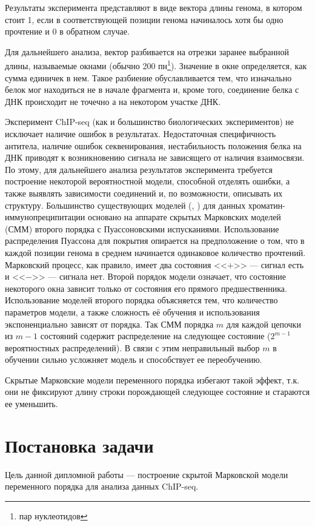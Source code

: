 \documentclass{matmex-diploma-custom}
\begin{document}
Результаты эксперимента представляют в виде вектора длины генома, в котором
стоит 1, если в соответствующей позиции генома начиналось хотя бы одно прочтение
и 0 в обратном случае.

Для дальнейшего анализа, вектор разбивается на отрезки заранее выбранной длины, называемые окнами (обычно 200 пн\footnote{пар нуклеотидов}). Значение в окне определяется, как сумма единичек в нем. 
Такое разбиение обуславливается тем, что изначально белок мог находиться не в начале фрагмента и, кроме того, соединение белка с ДНК происходит не точечно а на некотором участке ДНК.

Эксперимент ChIP-seq (как и большинство биологических
экспериментов) не исключает наличие ошибок в результатах. Недостаточная специфичность антитела, наличие ошибок секвенирования, нестабильность положения белка на ДНК приводят к возникновению сигнала не
зависящего от наличия взаимосвязи.
По этому, для дальнейшего анализа результатов эксперимента требуется построение некоторой вероятностной модели, способной отделять ошибки, а также 
выявлять зависимости соединений и, по возможности, описывать их структуру.
Большинство существующих моделей (\cite{Zhang2008}, \cite{Spyrou2009}) для данных
хроматин-иммунопреципитации основано на аппарате скрытых Марковских моделей (СММ) \cite{Rabiner1989}
второго порядка с Пуассоновскими испусканиями. Использование распределения
Пуассона для покрытия опирается на предположение о том, что в каждой
позиции генома в среднем начинается одинаковое количество прочтений.
\\Марковский процесс, как правило, имеет два состояния <<$+$>> --- сигнал есть и <<$-$>> --- сигнала нет. Второй порядок модели означает, что состояние некоторого окна зависит только от состояния его прямого предшественника.
Использование моделей второго порядка объясняется тем, что количество параметров
модели, а также сложность её обучения и использования экспоненциально зависят от
порядка. Так СММ порядка $ m $ для каждой цепочки из $ m-1 $ состояний содержит распределение на следующее состояние ($ 2^{m-1} $ вероятностных распределений). В связи с этим неправильный выбор $ m $ в обучении сильно усложняет модель и способствует ее переобучению. 

Скрытые Марковские модели переменного порядка избегают такой эффект, т.к. они не фиксируют длину строки порождающей следующее состояние и стараются ее уменьшить.

\section{Постановка задачи}
Цель данной дипломной работы --- построение скрытой Марковской модели переменного
порядка для анализа данных ChIP-seq.
\end{document}

